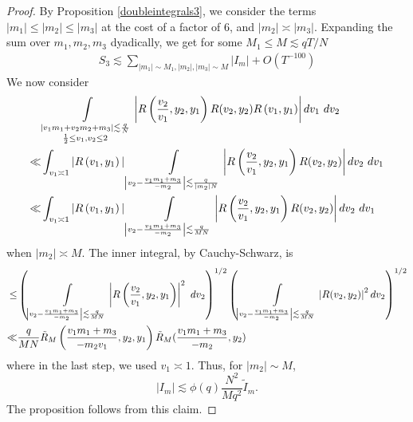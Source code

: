 \begin{proof}
By Proposition \ref{doubleintegrals3}, we consider the terms $|m_1|\leq |m_2|\leq|m_3|$ at the cost of a factor of $6$, and $|m_2|\asymp|m_3|$. Expanding the sum over $m_1,m_2,m_3$ dyadically, we get for some $M_1\leq M \lesssim qT/N $ \begin{align*}
    S_3\lesssim \sum_{|m_1|\sim M_1,|m_2|,|m_3|\sim M}|I_m| + O(T^{-100})
\end{align*}
We now consider
\begin{align*} 
   & \int\displaylimits_{\substack{
        |v_1m_1+v_2m_2+m_3|\lesssim \frac{q}{N}\\
        \frac{1}{2}\leq v_1,v_2\leq 2
    }} \left| R\left(\frac{v_2}{v_1},y_2,y_1\right)
    R(v_2,y_2)R\left(v_1,y_1\right)\right| dv_1 \ dv_2\\
     \ll& 
    \int_{v_1\asymp 1} |R\left(v_1,y_1\right)|
    \int\displaylimits_{\left|v_2 - \frac{v_1m_1+m_3}{-m_2}\right|\lesssim \frac{q}{|m_2|N}} \left| R\left(\frac{v_2}{v_1},y_2,y_1\right)
    R(v_2,y_2)\right|  dv_2 \ dv_1\\
    \ll& \int_{v_1\asymp 1} |R\left(v_1,y_1\right)|
    \int\displaylimits_{\left|v_2 - \frac{v_1m_1+m_3}{-m_2}\right|\lesssim \frac{q}{MN}} \left| R\left(\frac{v_2}{v_1},y_2,y_1\right)
    R(v_2,y_2)\right|  dv_2 \ dv_1\\
\end{align*}
when $|m_2|\asymp M$. The inner integral, by Cauchy-Schwarz,
is \begin{align*}
    \leq & \left(\int\displaylimits_{\left|v_2 - \frac{v_1m_1+m_3}{-m_2}\right|\lesssim \frac{q}{MN}} \left| R\left(\frac{v_2}{v_1},y_2,y_1\right)\right|^2 \ dv_2 \right)^{1/2}
    \left(
    \int\displaylimits_{\left|v_2 - \frac{v_1m_1+m_3}{-m_2}\right|\lesssim \frac{q}{MN}} \left|
    R(v_2,y_2)\right|^2  dv_2\right)^{1/2}\\
    \ll& \frac{q}{MN} \tilde{R}_M\left(\frac{v_1m_1+m_3}{-m_2v_1},y_2,y_1\right)  \tilde{R}_M(\frac{v_1m_1+m_3}{-m_2},y_2)
\end{align*}
where in the last step, we used $v_1\asymp 1$.
Thus, for $|m_2|\sim M$,
\[
|I_m|\lesssim \phi(q)\frac{N^2}{Mq^2}\tilde{I}_m.
\]
The proposition follows from this claim.
\end{proof}

